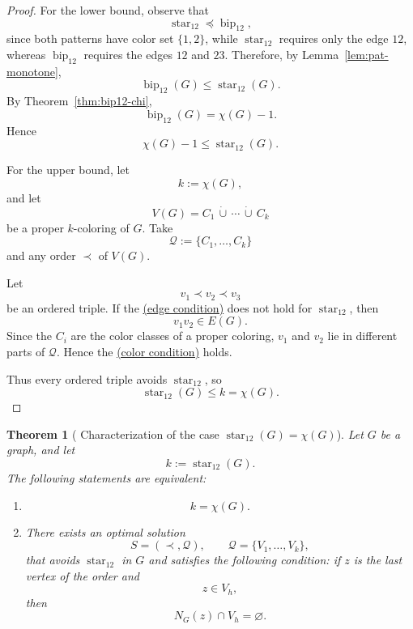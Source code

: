 \documentclass[12pt]{article}
\theoremstyle{plain}
\newtheorem{theorem}{Theorem}[section]
\theoremstyle{definition}
\theoremstyle{remark}
\theoremstyle{definition}
\newcommand{\edgecondition}{%
  \hyperref[def:avoid:cond:edge]{(edge condition)}\xspace
}
\newcommand{\colorcondition}{%
  \hyperref[def:avoid:cond:color]{(color condition)}\xspace
}
\newcommand{\starlabel}{\mathrm{star}}
\newcommand{\biplabel}{\mathrm{bip}}
\DeclareRobustCommand{\starparam}[1]{%
  \ensuremath{\mathop{\starlabel}\nolimits_{#1}}%
}
\DeclareRobustCommand{\bipparam}[1]{%
  \ensuremath{\mathop{\biplabel}\nolimits_{#1}}%
}
\begin{document}
\begin{proof}
For the lower bound, observe that
\[
\starparam{12}\preceq\bipparam{12},
\]
since both patterns have color set \(\{1,2\}\), while
\(\starparam{12}\) requires only the edge \(12\), whereas
\(\bipparam{12}\) requires the edges \(12\) and \(23\).
Therefore, by Lemma~\ref{lem:pat-monotone},
\[
\bipparam{12}(G)
\le
\starparam{12}(G).
\]
By Theorem~\ref{thm:bip12-chi},
\[
\bipparam{12}(G)=\chi(G)-1.
\]
Hence
\[
\chi(G)-1\le\starparam{12}(G).
\]

For the upper bound, let
\[
k:=\chi(G),
\]
and let
\[
V(G)=C_1\,\dot\cup\,\cdots\,\dot\cup\,C_k
\]
be a proper \(k\)-coloring of \(G\). Take
\[
\mathcal Q:=\{C_1,\dots,C_k\}
\]
and any order \(\prec\) of \(V(G)\).

Let
\[
v_1\prec v_2\prec v_3
\]
be an ordered triple. If the \edgecondition{} does not hold for
\(\starparam{12}\), then
\[
v_1v_2\in E(G).
\]
Since the \(C_i\) are the color classes of a proper coloring, \(v_1\) and
\(v_2\) lie in different parts of \(\mathcal Q\). Hence the
\colorcondition{} holds.

Thus every ordered triple avoids \(\starparam{12}\), so
\[
\starparam{12}(G)\le k=\chi(G).
\]
\end{proof}





\begin{theorem}[
Characterization of the case
\texorpdfstring{\(\starparam{12}(G)=\chi(G)\)}
{star12(G) = chi(G)}
]
\label{thm:star12-equals-chi}
Let \(G\) be a graph, and let
\[
k:=\starparam{12}(G).
\]
The following statements are equivalent:

\begin{enumerate}
\item
\[
k=\chi(G).
\]

\item There exists an optimal solution
\[
S=(\prec,\mathcal Q),
\qquad
\mathcal Q=\{V_1,\dots,V_k\},
\]
that avoids \(\starparam{12}\) in \(G\) and satisfies the following
condition: if \(z\) is the last vertex of the order and
\[
z\in V_h,
\]
then
\[
N_G(z)\cap V_h=\varnothing.
\]
\end{enumerate}
\end{theorem}
\end{document}
